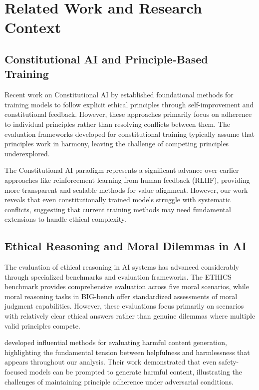 \documentclass[10pt,a4paper]{article}
\begin{document}
\section{Related Work and Research Context}

\subsection{Constitutional AI and Principle-Based Training}
Recent work on Constitutional AI by \citet{anthropic2022constitutional} established foundational methods for training models to follow explicit ethical principles through self-improvement and constitutional feedback. However, these approaches primarily focus on adherence to individual principles rather than resolving conflicts between them. The evaluation frameworks developed for constitutional training typically assume that principles work in harmony, leaving the challenge of competing principles underexplored.

The Constitutional AI paradigm represents a significant advance over earlier approaches like reinforcement learning from human feedback (RLHF), providing more transparent and scalable methods for value alignment. However, our work reveals that even constitutionally trained models struggle with systematic conflicts, suggesting that current training methods may need fundamental extensions to handle ethical complexity.

\subsection{Ethical Reasoning and Moral Dilemmas in AI}
The evaluation of ethical reasoning in AI systems has advanced considerably through specialized benchmarks and evaluation frameworks. The ETHICS benchmark \citet{hendrycks2020measuring} provides comprehensive evaluation across five moral scenarios, while moral reasoning tasks in BIG-bench \citet{srivastava2022beyond} offer standardized assessments of moral judgment capabilities. However, these evaluations focus primarily on scenarios with relatively clear ethical answers rather than genuine dilemmas where multiple valid principles compete.

\citet{gehman2020realtoxicityprompts} developed influential methods for evaluating harmful content generation, highlighting the fundamental tension between helpfulness and harmlessness that appears throughout our analysis. Their work demonstrated that even safety-focused models can be prompted to generate harmful content, illustrating the challenges of maintaining principle adherence under adversarial conditions.
\end{document}
